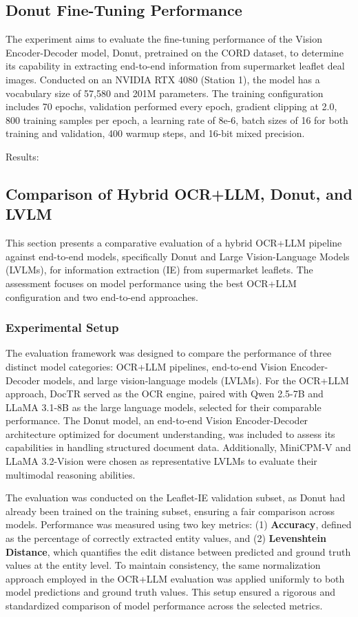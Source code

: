 \documentclass[11pt]{article}
\begin{document}
\subsection{Donut Fine-Tuning Performance}
The experiment aims to evaluate the fine-tuning performance of the Vision Encoder-Decoder model, Donut, pretrained on the CORD dataset, to determine its capability in extracting end-to-end information from supermarket leaflet deal images. Conducted on an NVIDIA RTX 4080 (Station 1), the model has a vocabulary size of 57,580 and 201M parameters. The training configuration includes 70 epochs, validation performed every epoch, gradient clipping at 2.0, 800 training samples per epoch, a learning rate of 8e-6, batch sizes of 16 for both training and validation, 400 warmup steps, and 16-bit mixed precision.

Results:

\subsection{Comparison of Hybrid OCR+LLM, Donut, and LVLM}

This section presents a comparative evaluation of a hybrid OCR+LLM pipeline against end-to-end models, specifically Donut and Large Vision-Language Models (LVLMs), for information extraction (IE) from supermarket leaflets. The assessment focuses on model performance using the best OCR+LLM configuration and two end-to-end approaches.

\subsubsection{Experimental Setup}

The evaluation framework was designed to compare the performance of three distinct model categories: OCR+LLM pipelines, end-to-end Vision Encoder-Decoder models, and large vision-language models (LVLMs). For the OCR+LLM approach, DocTR served as the OCR engine, paired with Qwen 2.5-7B and LLaMA 3.1-8B as the large language models, selected for their comparable performance. The Donut model, an end-to-end Vision Encoder-Decoder architecture optimized for document understanding, was included to assess its capabilities in handling structured document data. Additionally, MiniCPM-V \cite{yao2024} and LLaMA 3.2-Vision \cite{touvron2023} were chosen as representative LVLMs to evaluate their multimodal reasoning abilities.

The evaluation was conducted on the Leaflet-IE validation subset, as Donut had already been trained on the training subset, ensuring a fair comparison across models. Performance was measured using two key metrics: (1) \textbf{Accuracy}, defined as the percentage of correctly extracted entity values, and (2) \textbf{Levenshtein Distance}, which quantifies the edit distance between predicted and ground truth values at the entity level. To maintain consistency, the same normalization approach employed in the OCR+LLM evaluation was applied uniformly to both model predictions and ground truth values. This setup ensured a rigorous and standardized comparison of model performance across the selected metrics.
\end{document}
